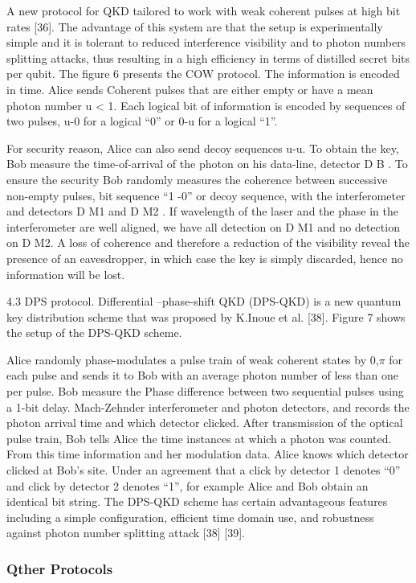 A new protocol for QKD tailored to work with weak coherent pulses at high bit rates [36]. The advantage of this system are that the setup is experimentally simple and it is tolerant to reduced interference visibility and to photon numbers splitting attacks, thus resulting in a high efficiency in terms of distilled secret bits per qubit. The figure 6 presents the COW protocol. The information is encoded in time. Alice sends Coherent pulses that are either empty or have a mean photon number u < 1. Each logical bit of information is encoded by sequences of two pulses, u-0 for a logical “0” or 0-u for a logical “1”.

For security reason, Alice can also send decoy sequences u-u. To obtain the key, Bob measure the time-of-arrival of the photon on his data-line, detector D B . To ensure the security Bob randomly measures the coherence between successive non-empty pulses, bit sequence “1 -0” or decoy sequence, with the interferometer and detectors D M1 and D M2 . If wavelength of the laser and the phase in the interferometer are well aligned, we have all detection on D M1 and no detection on D M2. A loss of coherence and therefore a reduction of the visibility reveal the presence of an eavesdropper, in which case the key is simply discarded, hence no information will be lost.

4.3 DPS protocol. Differential –phase-shift QKD (DPS-QKD) is a new quantum key distribution scheme that was proposed by K.Inoue et al. [38]. Figure 7 shows the setup of the DPS-QKD scheme.

Alice randomly phase-modulates a pulse train of weak coherent states by {0,$\pi$} for each pulse and sends it to Bob with an average photon number of less than one per pulse. Bob measure the Phase difference between two sequential pulses using a 1-bit delay. Mach-Zehnder interferometer and photon detectors, and records the photon arrival time and which detector clicked. After transmission of the optical pulse train, Bob tells Alice the time instances at which a photon was counted. From this time information and her modulation data. Alice knows which detector clicked at Bob's site. Under an agreement that a click by detector 1 denotes “0” and click by detector 2 denotes “1”, for example Alice and Bob obtain an identical bit string.
The DPS-QKD scheme has certain advantageous features including a simple configuration, efficient time domain use, and robustness against photon number splitting attack [38] [39].

\subsubsection{Qther Protocols}

